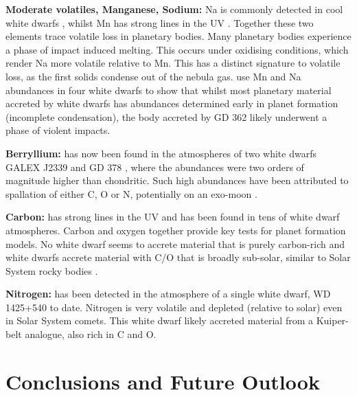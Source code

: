 \documentclass[onecolumn,authoryear]{els-mrw}
\newcommand\eg{{\it e.g.} }
\begin{document}
{\bf Moderate volatiles, Manganese, Sodium:}
Na is commonly detected in cool white dwarfs \citep[\eg][]{Hollands2017}, whilst Mn has strong lines in the UV \citep[\eg][]{Gaensicke2012}. Together these two elements trace volatile loss in planetary bodies. Many planetary bodies experience a phase of impact induced melting. This occurs under oxidising conditions, which render Na more volatile relative to Mn. This has a distinct signature to volatile loss, as the first solids condense out of the nebula gas. \cite{Harrison_MnNa} use Mn and Na abundances in four white dwarfs to show that whilst most planetary material accreted by white dwarfs has abundances determined early in planet formation (incomplete condensation), the body accreted by GD 362 likely underwent a phase of violent impacts.  


{\bf Berryllium:} has now been found in the atmospheres of two white dwarfs GALEX J2339 and GD 378 \citep{Klein2021}, where the abundances were two orders of magnitude higher than chondritic. Such high abundances have been attributed to spallation of either C, O or N, potentially on an exo-moon \citep{Doyle2021}. 

{\bf Carbon:} has strong lines in the UV and has been found in tens of white dwarf atmospheres. Carbon and oxygen together provide key tests for planet formation models. No white dwarf seems to accrete material that is purely carbon-rich and white dwarfs accrete material with C/O that is broadly sub-solar, similar to Solar System rocky bodies \citep{Wilson2016, Rogers2024}.


{\bf Nitrogen:} has been detected in the atmosphere of a single white dwarf, WD 1425+540 \citep{Xu2017} to date. Nitrogen is very volatile and depleted (relative to solar) even in Solar System comets. This white dwarf likely accreted material from a Kuiper-belt analogue, also rich in C and O. 



\section {Conclusions and Future Outlook }
\end{document}
